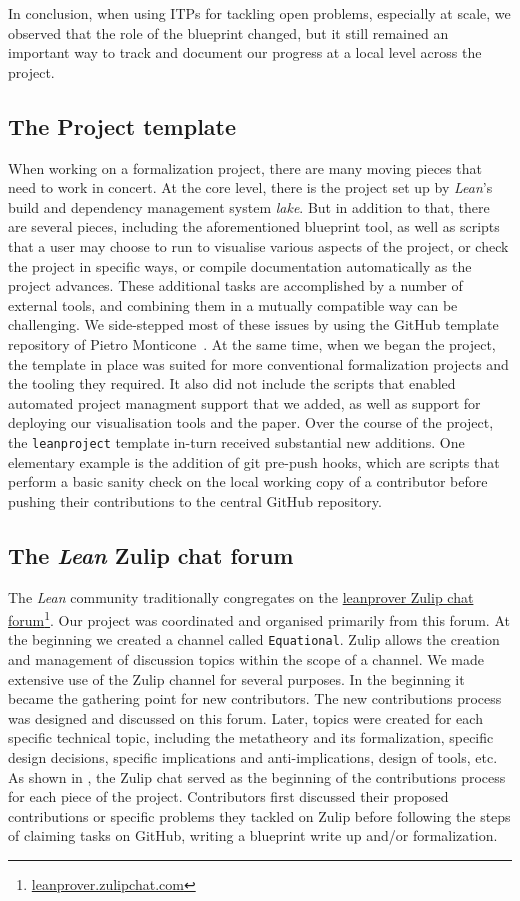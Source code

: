 In conclusion, when using ITPs for tackling open problems, especially at scale, we observed that the role of the blueprint changed, but it still remained an important way to track and document our progress at a local level across the project.

\subsection{The Project template}
When working on a formalization project, there are many moving pieces that need to work in concert. At the core level, there is the project set up by \emph{Lean}'s build and dependency management system \emph{lake}. But in addition to that, there are several pieces, including the aforementioned blueprint tool, as well as scripts that a user may choose to run to visualise various aspects of the project, or check the project in specific ways, or compile documentation automatically as the project advances. These additional tasks are accomplished by a number of external tools, and combining them in a mutually compatible way can be challenging. We side-stepped most of these issues by using the GitHub template repository of Pietro Monticone~\cite{Monticone_LeanProject_2025}. At the same time, when we began the project, the template in place was suited for more conventional formalization projects and the tooling they required. It also did not include the scripts that enabled automated project managment support that we added, as well as support for deploying our visualisation tools and the paper. Over the course of the project, the \texttt{leanproject} template in-turn received substantial new additions. One elementary example is the addition of git pre-push hooks, which are scripts that perform a basic sanity check on the local working copy of a contributor before pushing their contributions to the central GitHub repository.

\subsection{The  \emph{Lean} Zulip chat forum}
The \emph{Lean} community traditionally congregates on the \href{leanprover.zulipchat.com}{leanprover Zulip chat forum}\footnote{\url{leanprover.zulipchat.com}}. Our project was coordinated and organised primarily from this forum. At the beginning we created a channel called \texttt{Equational}. Zulip allows the creation and management of discussion topics within the scope of a channel. We made extensive use of the Zulip channel for several purposes. In the beginning it became the gathering point for new contributors. The new contributions process was designed and discussed on this forum. Later, topics were created for each specific technical topic, including the metatheory and its formalization, specific design decisions, specific implications and anti-implications, design of tools, etc. As shown in , the Zulip chat served as the beginning of the contributions process for each piece of the project. Contributors first discussed their proposed contributions or specific problems they tackled on Zulip before following the steps of claiming tasks on GitHub, writing a blueprint write up and/or formalization.

